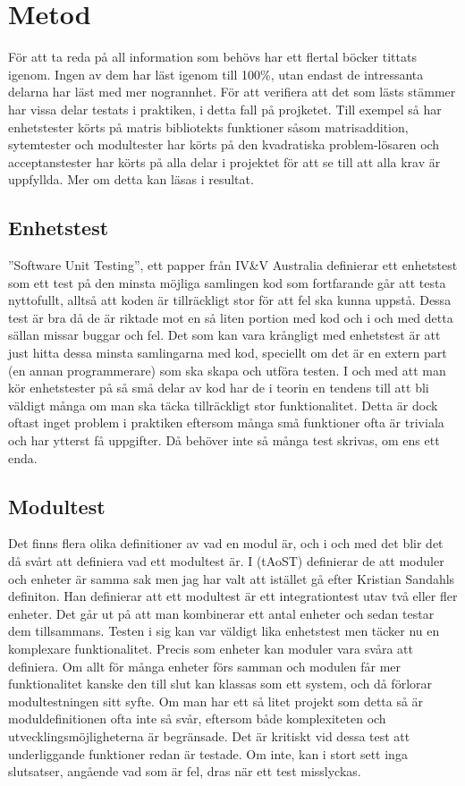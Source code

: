 \section{Metod}
	För att ta reda på all information som behövs har ett flertal böcker tittats igenom. Ingen av dem har läst igenom till 100\%, utan endast de intressanta delarna har läst med mer nogrannhet. För att verifiera att det som lästs stämmer har vissa delar testats i praktiken, i detta fall på projketet. Till exempel så har enhetstester körts på matris bibliotekts funktioner såsom matrisaddition, sytemtester och modultester har körts på den kvadratiska problem-lösaren och acceptanstester har körts på alla delar i projektet för att se till att alla krav är uppfyllda. Mer om detta kan läsas i resultat.
	
\subsection{Enhetstest}
	''Software Unit Testing'', ett papper från IV\&V Australia definierar ett enhetstest som ett test på den minsta möjliga samlingen kod som fortfarande går att testa nyttofullt, alltså att koden är tillräckligt stor för att fel ska kunna uppstå. Dessa test är bra då de är riktade mot en så liten portion med kod och i och med detta sällan missar buggar och fel. Det som kan vara krångligt med enhetstest är att just hitta dessa minsta samlingarna med kod, speciellt om det är en extern part (en annan programmerare) som ska skapa och utföra testen. I och med att man kör enhetstester på så små delar av kod har de i teorin en tendens till att bli väldigt många om man ska täcka tillräckligt stor funktionalitet. Detta är dock oftast inget problem i praktiken eftersom många små funktioner ofta är triviala och har ytterst få uppgifter. Då behöver inte så många test skrivas, om ens ett enda.
\subsection{Modultest}	
	Det finns flera olika definitioner av vad en modul är, och i och med det blir det då svårt att definiera vad ett modultest är. I (tAoST) definierar de att moduler och enheter är samma sak men jag har valt att istället gå efter Kristian Sandahls definiton. Han definierar att ett modultest är ett integrationtest utav två eller fler enheter. Det går ut på att man kombinerar ett antal enheter och sedan testar dem tillsammans. Testen i sig kan var väldigt lika enhetstest men täcker nu en komplexare funktionalitet. Precis som enheter kan moduler vara svåra att definiera. Om allt för många enheter förs samman och modulen får mer funktionalitet kanske den till slut kan klassas som ett system, och då förlorar modultestningen sitt syfte. Om man har ett så litet projekt som detta så är moduldefinitionen ofta inte så svår, eftersom både komplexiteten och utvecklingsmöjligheterna är begränsade. Det är kritiskt vid dessa test att underliggande funktioner redan är testade. Om inte, kan i stort sett inga slutsatser, angående vad som är fel, dras när ett test misslyckas.

